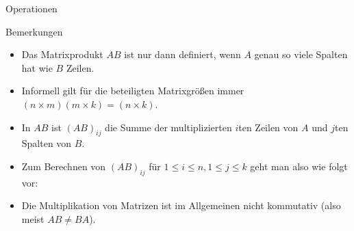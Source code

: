 \documentclass[
  8pt,
  ignorenonframetext,
]{beamer}
\begin{document}
\begin{frame}{Operationen}
\protect\hypertarget{operationen-14}{}
\small

Bemerkungen  \small

\begin{itemize}
\justifying
\item Das Matrixprodukt $AB$ ist nur dann definiert, wenn $A$ genau so viele Spalten hat wie $B$ Zeilen.
\item Informell gilt für die beteiligten Matrixgrößen immer $(n \times m)(m \times k) = (n \times k)$.
\item In $AB$ ist $(AB)_{ij}$ die Summe der multiplizierten $i$ten Zeilen von $A$ und $j$ten Spalten von $B$.
\item Zum Berechnen von $(AB)_{ij}$ für $1 \le i \le n, 1 \le j \le k$ geht man also wie folgt vor:
\begin{enumerate}
\end{enumerate}
\item Die Multiplikation von Matrizen ist im Allgemeinen nicht kommutativ (also meist $AB \neq BA$).
\end{itemize}
\end{frame}
\end{document}

